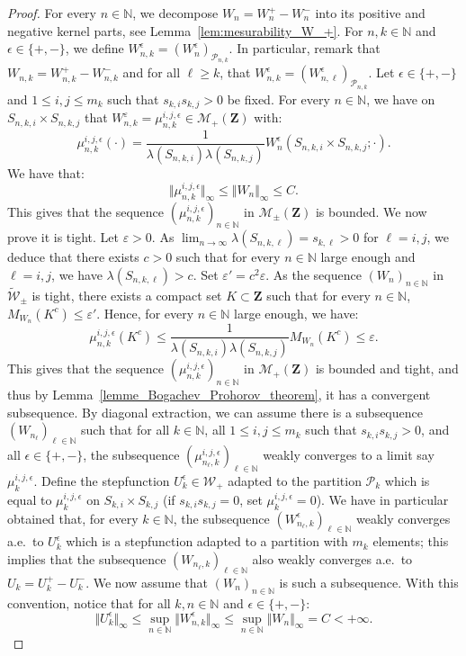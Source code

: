 \documentclass{amsart}
\newcommand{\aE}{a.e.\ }
\theoremstyle{plain}
\theoremstyle{definition}
\newcommand{\Space}{\mathbf{Z}}
\newcommand{\signed}{\pm}
\newcommand{\cp}{\mathcal{P}}
\newcommand{\cP}{\mathcal{P}}
\newcommand{\Meas}{\mathcal{M}_+(\Space)}
\newcommand{\SignedMeas}{\mathcal{M}_{\pm}(\Space)}
\newcommand{\Kernelp}{\mathcal{W}_{+}}
\newcommand{\UKernel}{\widetilde{\mathcal{W}}_{\signed}}
\newcommand{\TotalMass}[1]{\norm{#1}_\infty}
\newcommand{\TM}[1]{\norm{#1}_\infty}
\newcommand{\N}{\mathbb{N}}
\newcommand{\norm}[1]{\Vert#1\Vert}
\newcommand{\eps}{\varepsilon}
\begin{document}
\begin{proof}
For every $n\in\N$, we decompose $W_n = W_n^+ - W_n^-$ 
into its positive and negative kernel parts, see Lemma~\ref{lem:mesurability_W_+}.
For $n,k\in\N$ and $\epsilon\in\{+,-\}$, 
	we define $W_{n,k}^\epsilon = (W_n^\epsilon)_{\cP_{n,k}}$.
In particular, remark that $W_{n,k} = W_{n,k}^+ - W_{n,k}^-$
	and    for   all    $\ell\geq    k$,    that
	$W_{n,k}^\epsilon = (W_{n,\ell}^\epsilon)_{\mathcal{P}_{n,k}}$.
Let $\epsilon\in\{+,-\}$ and $1\leq i,j \leq m_k$ such that $s_{k,i}s_{k,j}>0$ be fixed. 
For every $n\in\N$,
we have on $S_{n,k,i}\times S_{n,k,j}$ that
$W_{n,k}^\eps = \mu_{n,k}^{i,j,\epsilon} \in\Meas$ with:
\[
\mu_{n,k}^{i,j,\epsilon}(\cdot)
= \frac{1}{\lambda(S_{n,k,i})\lambda(S_{n,k,j})}
W_n^\epsilon(S_{n,k,i}\times  S_{n,k,j}; \cdot)
. \]
We have that:
\[
  \TotalMass{\mu_{n,k}^{i,j,\epsilon}}
  \leq  \TM{W_n} \leq C.
\]
This gives that  the sequence $(\mu_{n,k}^{i,j,\epsilon} )_{n\in\N}$ in $\SignedMeas$ is
 bounded. We now prove it is tight. 
Let $\eps>0$.
As $\lim_{n\rightarrow \infty } \lambda(S_{n,k,\ell}) =s_{k,\ell}>0$ for
$\ell=i,j$,
we deduce that there exists  $c>0$ such that for every $n\in
\N$ large enough and $\ell=i,j$, we have
$\lambda(S_{n,k,\ell}) > c$. 
Set $\eps' = c^2 \eps$.
As the sequence $( W_n )_{n\in\N}$ in $\UKernel$ is  tight,
there exists  a compact set $K \subset \Space$ such that
for every $n\in\N$, $M_{W_n}(K^c) \leq   \eps'$.
Hence, for every $n\in \N$ large enough, we have:
\begin{equation*}
   \mu_{n,k}^{i,j,\epsilon} (K^c)\leq  
  \frac{1}{\lambda(S_{n,k,i})\lambda(S_{n,k,j})} M_{W_n}(K^c)
  \leq  \varepsilon.
\end{equation*}
This gives that  the sequence $(\mu_{n,k}^{i,j,\epsilon} )_{n\in\N}$  in $\Meas$
	is bounded and tight, and thus by Lemma~\ref{lemme_Bogachev_Prohorov_theorem},
	it has a convergent subsequence.
By diagonal extraction, we can assume there is a subsequence  $(W_{n_\ell})_{\ell\in\N}$ 
such that for all $k\in \N$, all $1\leq i, j\leq  m_k$ such
that $s_{k,i}s_{k,j}>0$, and all $\epsilon \in \{+,-\}$,
  the subsequence $(\mu_{n_\ell,k}^{i,j,\epsilon} )_{\ell\in\N}$
weakly converges to a limit say $\mu_{k}^{i,j,\epsilon}$. 
Define the stepfunction $U_k^\epsilon\in \Kernelp$ adapted to the partition $\cp_k$
which is  equal to $\mu_{k}^{i,j,\epsilon}$ on $S_{k,i}\times S_{k,j}$
(if $s_{k,i}s_{k,j}=0$, set $\mu_{k}^{i,j,\epsilon} = 0$). 
We have in particular obtained that, for every $k\in \N$, the subsequence
$(W_{n_\ell,k}^\epsilon )_{\ell\in\N}$
 weakly converges \aE to $U_k^\epsilon$ which is 
a stepfunction adapted to a partition with $m_k$ elements;
this implies that the subsequence
$(W_{n_\ell,k} )_{\ell\in\N}$ also weakly converges \aE to $U_k = U_k^+ - U_k^-$.
We now assume that $(W_{n})_{n\in\N}$ is such a subsequence. 
With this convention, notice that for all $k, n\in \N$ and $\epsilon \in \{+,-\}$:
\begin{equation}
  \label{eq:Uk-bded}
  \TM{U_k^\epsilon} \leq \sup_{n\in\N} \TM{W_{n,k}^\epsilon}\leq  \sup_{n\in\N} \TM{W_n} =
C<+\infty .
\end{equation}


\end{proof}
\end{document}
